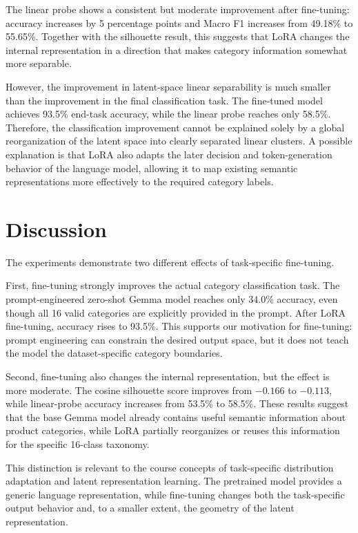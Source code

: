 \documentclass{article}
\begin{document}
The linear probe shows a consistent but moderate improvement after
fine-tuning: accuracy increases by 5 percentage points and Macro F1 increases
from 49.18\% to 55.65\%. Together with the silhouette result, this suggests
that LoRA changes the internal representation in a direction that makes
category information somewhat more separable.

However, the improvement in latent-space linear separability is much smaller
than the improvement in the final classification task. The fine-tuned model
achieves 93.5\% end-task accuracy, while the linear probe reaches only 58.5\%.
Therefore, the classification improvement cannot be explained solely by a
global reorganization of the latent space into clearly separated linear
clusters. A possible explanation is that LoRA also adapts the later
decision and token-generation behavior of the language model, allowing it to
map existing semantic representations more effectively to the required
category labels.


\section{Discussion}

The experiments demonstrate two different effects of task-specific
fine-tuning.

First, fine-tuning strongly improves the actual category classification task.
The prompt-engineered zero-shot Gemma model reaches only 34.0\% accuracy,
even though all 16 valid categories are explicitly provided in the prompt.
After LoRA fine-tuning, accuracy rises to 93.5\%. This supports our
motivation for fine-tuning: prompt engineering can constrain the desired
output space, but it does not teach the model the dataset-specific category
boundaries.

Second, fine-tuning also changes the internal representation, but the effect
is more moderate. The cosine silhouette score improves from $-0.166$ to
$-0.113$, while linear-probe accuracy increases from 53.5\% to 58.5\%.
These results suggest that the base Gemma model already contains useful
semantic information about product categories, while LoRA partially
reorganizes or reuses this information for the specific 16-class taxonomy.

This distinction is relevant to the course concepts of task-specific
distribution adaptation and latent representation learning. The pretrained
model provides a generic language representation, while fine-tuning changes
both the task-specific output behavior and, to a smaller extent, the
geometry of the latent representation.
\end{document}
